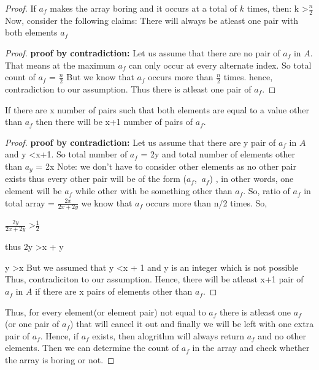 \documentclass[11pt]{article}
\begin{document}
\begin{proof}
If $a_f$ makes the array boring and it occurs at a total of $k$ times, then: \newline
k \textgreater $\frac{n}{2}$ \newline
Now, consider the following claims: \newline
{} There will always be atleast one pair with both elements $a_f$
\begin{proof}
{\bf proof by contradiction:} Let us assume that there are no pair of $a_f$ in $A$. That means at the maximum $a_f$ can only
occur at every alternate index. So total count of $a_f$ = $\frac{n}{2}$ \newline
But we know that $a_f$ occurs more than $\frac{n}{2}$ times. hence, contradiction to our assumption. Thus there is atleast one
pair of $a_f$.
\end{proof}
 If there are x number of pairs such that both elements are equal to a value other than $a_f$
then there will be x+1 number of pairs of $a_f$.
\begin{proof}
{\bf proof by contradiction:} Let us assume that there are y pair of $a_f$ in $A$ and y \textless  x+1.  \newline
So total number of $a_f$ = 2y \newline
and total number of elements other than $a_y$ = 2x \newline
Note: we don't have to consider other elements as no other pair exists thus every other pair will be of the form ($a_f$, $~a_f$)
, in  other words, one element will be $a_f$ while other with be something other than $a_f$. \newline
So,  ratio of $a_f$ in total array = $\frac{2x}{2x+2y}$ \newline
we know that $a_f$ occurs more than n/2 times. So, \newline

$\frac{2y}{2x+2y}$  \textgreater $\frac{1}{2}$

thus 2y \textgreater x + y \newline

y \textgreater x But we assumed that y \textless  x + 1 and y is an integer which is not possible \newline
Thus, contradiciton to our assumption. \newline
Hence, there will be atleast x+1 pair of $a_f$ in $A$ if there are x pairs of elements other than $a_f$.
\end{proof}
Thus, for every element(or element pair) not equal to  $a_f$ there is atleast one $a_f$ (or one pair of $a_f$) that will cancel it out and
finally we will be left with one extra pair of $a_f$. \newline
Hence, if $a_f$ exists, then alogrithm will always return $a_f$ and no other elements.
Then we can determine the count of $a_f$ in the array and check whether  the array is boring or not.
\end{proof}
\end{document}
